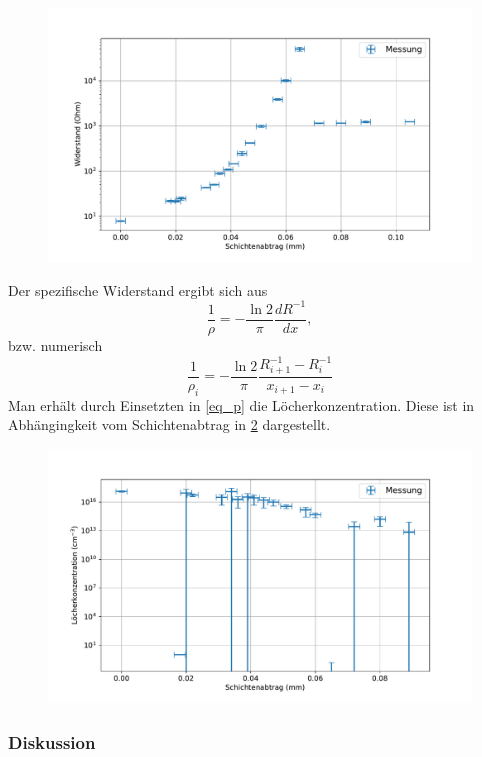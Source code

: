 \documentclass[
	a4paper,
	12pt,
	pagesize,
	ngerman
]{scrartcl}
\begin{document}
	\begin{figure}[H]
			\includegraphics[width=.9\linewidth]{img/polier_wdst.pdf}
			\caption{
							}
			\label{fig_polier_wdst}
	\end{figure}

	Der spezifische Widerstand ergibt sich aus
	\begin{equation}
		\frac{1}{\rho} = - \frac{\ln 2}{\pi} \frac{d R^{-1}}{dx},
	\end{equation}
	bzw. numerisch
	\begin{equation}
		\frac{1}{\rho_i} = - \frac{\ln 2 }{\pi} \frac{R^{-1}_{i+1}-R^{-1}_{i}}{x_{i+1}-x_i}
	\end{equation}
	Man erhält durch Einsetzten in \cref{eq_p} die Löcherkonzentration.
	Diese ist in Abhängingkeit vom Schichtenabtrag in \cref{fig_polier_konz} dargestellt.

	\begin{figure}[H]
			\includegraphics[width=.9\linewidth]{img/polier_konz.pdf}
			\caption{
							}
			\label{fig_polier_konz}
	\end{figure}

	\subsubsection{Diskussion}
\end{document}
